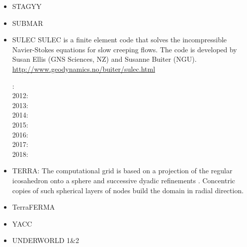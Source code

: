\begin{itemize}
\item STAGYY
\cite{rota11}
\cite{yadl14}
\cite{crta14}
\cite{sisc16}
\cite{cogu17}
\cite{cosh18}\cite{bofc18}\cite{cold18}\cite{arcf18}
\cite{gult19}\cite{argc19}\cite{deli19}

\item SUBMAR

\cite{masr06}
\cite{masp07}
\cite{roms10}


\item SULEC
SULEC is a finite element code that solves the incompressible Navier-Stokes equations 
for slow creeping flows. The code is developed by Susan Ellis 
(GNS Sciences, NZ) and Susanne Buiter (NGU). 
\url{http://www.geodynamics.no/buiter/sulec.html}

: \cite{qube11}\cite{ellw11}\\
2012: \cite{buit12}\cite{tebu12}\cite{crsg12}\cite{grel12}\\
2013: \cite{ghbu13}\\
2014: \cite{ghbu14}\cite{qubu14}\\
2015: \cite{nabu15}\\
2016: \cite{zwsn16}\\
2017: \cite{nabp17}\\
2018: \cite{tebu18}











\item TERRA:
The computational grid is based on a projection of the regular icosahedron onto a 
sphere and successive dyadic refinements \cite{bafr85}.  Concentric copies of such  
spherical layers of nodes build the domain in radial direction.

\cite{baum83}
\cite{glat88}
\cite{buba95}
\cite{burb97}\cite{yang97}
\cite{burl98}
\cite{phbs09}\cite{wodd09}\cite{gows09}
\cite{woda11}
\cite{dadb13}
\cite{vade16}

\item TerraFERMA
\cite{wisv14}
\cite{wisv17}
\cite{spmw16}
\cite{ceww17}
\cite{ceww19}


\item YACC
\cite{tosn15}
\cite{tomy16}

\item UNDERWORLD 1\&2


\end{itemize}
